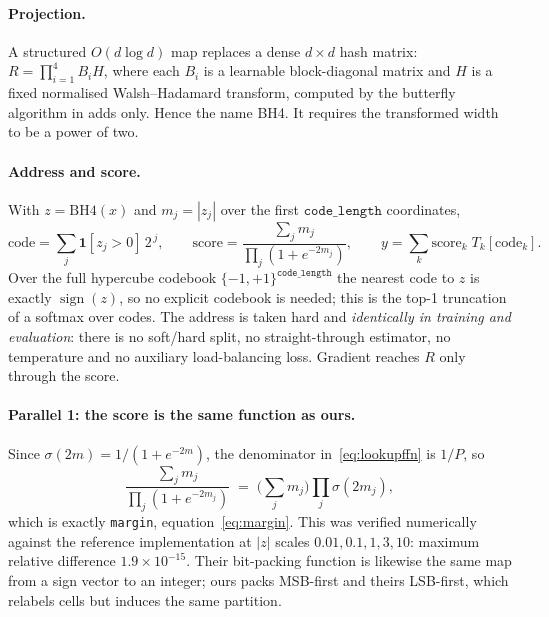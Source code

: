 \documentclass[11pt]{article}
\newcommand{\sgn}{\operatorname{sign}}
\begin{document}
\paragraph{Projection.} A structured $O(d\log d)$ map replaces a dense $d\times d$ hash
matrix: $R=\prod_{i=1}^{4} B_i H$, where each $B_i$ is a learnable block-diagonal matrix
and $H$ is a fixed normalised Walsh--Hadamard transform, computed by the butterfly
algorithm in adds only. Hence the name BH4. It requires the transformed width to be a
power of two.

\paragraph{Address and score.} With $z=\mathrm{BH4}(x)$ and $m_j=|z_j|$ over the first
$\texttt{code\_length}$ coordinates,
\begin{equation}
  \text{code} = \sum_j \mathbf{1}[z_j>0]\,2^{\,j},
  \qquad
  \text{score} = \frac{\sum_j m_j}{\prod_j \left(1+e^{-2m_j}\right)},
  \qquad
  y = \sum_k \text{score}_k\; T_k[\text{code}_k].
  \label{eq:lookupffn}
\end{equation}
Over the full hypercube codebook $\{-1,+1\}^{\texttt{code\_length}}$ the nearest code to
$z$ is exactly $\sgn(z)$, so no explicit codebook is needed; this is the top-1 truncation
of a softmax over codes. The address is taken hard and \emph{identically in training and
evaluation}: there is no soft/hard split, no straight-through estimator, no temperature
and no auxiliary load-balancing loss. Gradient reaches $R$ only through the score.

\paragraph{Parallel 1: the score is the same function as ours.}
Since $\sigma(2m)=1/(1+e^{-2m})$, the denominator in~\eqref{eq:lookupffn} is $1/P$, so
\begin{equation}
  \frac{\sum_j m_j}{\prod_j (1+e^{-2m_j})}
  \;=\; \Big(\sum_j m_j\Big)\prod_j \sigma(2m_j),
\end{equation}
which is exactly \texttt{margin}, equation~\eqref{eq:margin}. This was verified
numerically against the reference implementation at $|z|$ scales
$0.01,0.1,1,3,10$: maximum relative difference $1.9\times10^{-15}$. Their bit-packing
function is likewise the same map from a sign vector to an integer; ours packs MSB-first
and theirs LSB-first, which relabels cells but induces the same partition.
\end{document}

